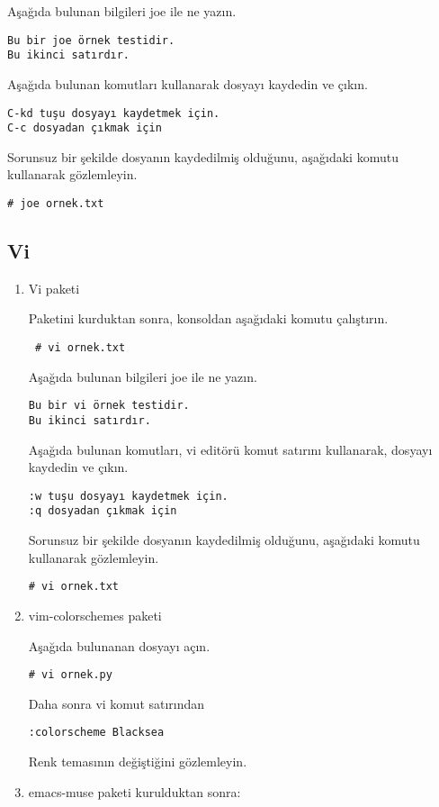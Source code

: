 \documentclass[a4paper,10pt]{article}
\begin{document}
Aşağıda bulunan bilgileri joe ile ne yazın.
\begin{verbatim}
Bu bir joe örnek testidir.
Bu ikinci satırdır.
\end{verbatim}

Aşağıda bulunan komutları kullanarak dosyayı kaydedin ve çıkın.
\begin{verbatim}
C-kd tuşu dosyayı kaydetmek için.
C-c dosyadan çıkmak için
\end{verbatim}


Sorunsuz bir şekilde dosyanın kaydedilmiş olduğunu, aşağıdaki komutu kullanarak gözlemleyin.
\begin{verbatim}
# joe ornek.txt 
\end{verbatim}

\subsection*{Vi}

\begin{enumerate}

\item Vi paketi

Paketini kurduktan sonra, konsoldan aşağıdaki komutu çalıştırın.

\begin{verbatim}
 # vi ornek.txt
\end{verbatim}

Aşağıda bulunan bilgileri joe ile ne yazın.
\begin{verbatim}
Bu bir vi örnek testidir.
Bu ikinci satırdır.
\end{verbatim}

Aşağıda bulunan komutları, vi editörü komut satırını kullanarak, dosyayı kaydedin ve çıkın.
\begin{verbatim}
:w tuşu dosyayı kaydetmek için.
:q dosyadan çıkmak için
\end{verbatim}

Sorunsuz bir şekilde dosyanın kaydedilmiş olduğunu, aşağıdaki komutu kullanarak gözlemleyin.
\begin{verbatim}
# vi ornek.txt 
\end{verbatim}

\item vim-colorschemes paketi

Aşağıda bulunanan dosyayı açın.
\begin{verbatim}
# vi ornek.py
\end{verbatim}

Daha sonra vi komut satırından 
\begin{verbatim}
:colorscheme Blacksea
\end{verbatim}

Renk temasının değiştiğini gözlemleyin.

\item emacs-muse paketi kurulduktan sonra:


\end{enumerate}
\end{document}
